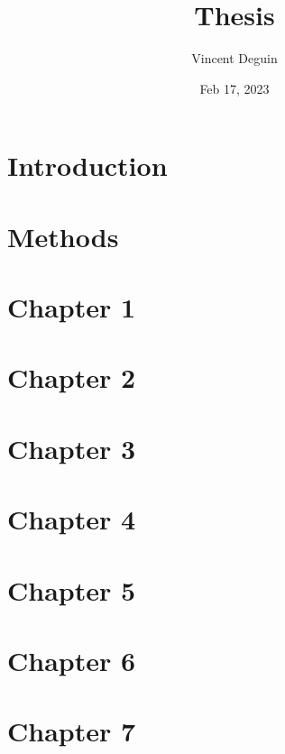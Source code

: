 \documentclass[letterpaper,10pt,english]{jupyterBook}
\title{Thesis}
\date{Feb 17, 2023}
\author{Vincent Deguin}
\begin{document}
\pagestyle{empty}
\sphinxmaketitle
\pagestyle{plain}
\sphinxtableofcontents
\pagestyle{normal}
\label{\detokenize{intro::doc}}


\sphinxstepscope


\chapter{Introduction}
\label{\detokenize{Introduction/Introduction:introduction}}\label{\detokenize{Introduction/Introduction::doc}}
\sphinxstepscope


\chapter{Methods}
\label{\detokenize{Methods/Methods:methods}}\label{\detokenize{Methods/Methods::doc}}
\sphinxstepscope


\chapter{Chapter 1}
\label{\detokenize{Chapter1/Chapter1:chapter-1}}\label{\detokenize{Chapter1/Chapter1::doc}}
\sphinxstepscope


\chapter{Chapter 2}
\label{\detokenize{Chapter2/Chapter2:chapter-2}}\label{\detokenize{Chapter2/Chapter2::doc}}
\sphinxstepscope


\chapter{Chapter 3}
\label{\detokenize{Chapter3/Chapter3:chapter-3}}\label{\detokenize{Chapter3/Chapter3::doc}}
\sphinxstepscope


\chapter{Chapter 4}
\label{\detokenize{Chapter4/Chapter4:chapter-4}}\label{\detokenize{Chapter4/Chapter4::doc}}
\sphinxstepscope


\chapter{Chapter 5}
\label{\detokenize{Chapter5/Chapter5:chapter-5}}\label{\detokenize{Chapter5/Chapter5::doc}}
\sphinxstepscope


\chapter{Chapter 6}
\label{\detokenize{Chapter6/Chapter6:chapter-6}}\label{\detokenize{Chapter6/Chapter6::doc}}
\sphinxstepscope


\chapter{Chapter 7}
\label{\detokenize{Chapter7/Chapter7:chapter-7}}\label{\detokenize{Chapter7/Chapter7::doc}}






\renewcommand{\indexname}{Index}
\printindex
\end{document}
